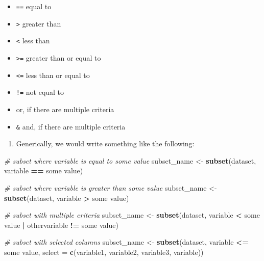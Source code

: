 \documentclass[
]{book}
\newenvironment{Shaded}{\begin{snugshade}}{\end{snugshade}}
\newcommand{\AttributeTok}[1]{\textcolor[rgb]{0.13,0.29,0.53}{#1}}
\newcommand{\CommentTok}[1]{\textcolor[rgb]{0.56,0.35,0.01}{\textit{#1}}}
\newcommand{\FunctionTok}[1]{\textcolor[rgb]{0.13,0.29,0.53}{\textbf{#1}}}
\newcommand{\NormalTok}[1]{#1}
\newcommand{\OtherTok}[1]{\textcolor[rgb]{0.56,0.35,0.01}{#1}}
\newcommand{\SpecialCharTok}[1]{\textcolor[rgb]{0.81,0.36,0.00}{\textbf{#1}}}
\providecommand{\tightlist}{%
  \setlength{\itemsep}{0pt}\setlength{\parskip}{0pt}}
\begin{document}
\begin{itemize}
\tightlist
\item
  \texttt{==} equal to
\item
  \texttt{\textgreater{}} greater than
\item
  \texttt{\textless{}} less than
\item
  \texttt{\textgreater{}=} greater than or equal to
\item
  \texttt{\textless{}=} less than or equal to
\item
  \texttt{!=} not equal to
\item
  \texttt{\textbar{}} or, if there are multiple criteria
\item
  \texttt{\&} and, if there are multiple criteria
\end{itemize}

\begin{enumerate}
\def\labelenumi{\arabic{enumi}.}
\setcounter{enumi}{5}
\tightlist
\item
  Generically, we would write something like the following:
\end{enumerate}

\begin{Shaded}
\begin{Highlighting}[]
\CommentTok{\# subset where variable is equal to some value}
\NormalTok{subset\_name }\OtherTok{\textless{}{-}} \FunctionTok{subset}\NormalTok{(dataset, variable }\SpecialCharTok{==}\NormalTok{ some value)}

\CommentTok{\# subset where variable is greater than some value}
\NormalTok{subset\_name }\OtherTok{\textless{}{-}} \FunctionTok{subset}\NormalTok{(dataset, variable }\SpecialCharTok{\textgreater{}}\NormalTok{ some value)}

\CommentTok{\# subset with multiple criteria}
\NormalTok{subset\_name }\OtherTok{\textless{}{-}} \FunctionTok{subset}\NormalTok{(dataset, variable }\SpecialCharTok{\textless{}}\NormalTok{ some value }\SpecialCharTok{|}
\NormalTok{                        othervariable }\SpecialCharTok{!=}\NormalTok{ some value)}

\CommentTok{\# subset with selected columns}
\NormalTok{subset\_name }\OtherTok{\textless{}{-}} \FunctionTok{subset}\NormalTok{(dataset, variable }\SpecialCharTok{\textless{}=}\NormalTok{ some value,}
                      \AttributeTok{select =} \FunctionTok{c}\NormalTok{(variable1, variable2, variable3, variable))}
\end{Highlighting}
\end{Shaded}
\end{document}
